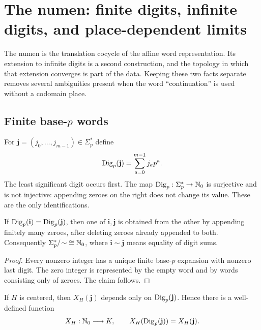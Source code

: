 \section{The numen: finite digits, infinite digits, and place-dependent limits}
\label{sec:numen}

The numen is the translation cocycle of the affine word representation.  Its
extension to infinite digits is a second construction, and the topology in
which that extension converges is part of the data.  Keeping these two facts
separate removes several ambiguities present when the word ``continuation''
is used without a codomain place.

\subsection{Finite base-\texorpdfstring{$p$}{p} words}

For $\mathbf j=(j_0,\ldots,j_{m-1})\in\Sigma_p^*$ define
\begin{equation}
\label{eq:digsum}
 \operatorname{Dig}_p(\mathbf j)=\sum_{a=0}^{m-1}j_ap^a.
\end{equation}
The least significant digit occurs first.  The map $\operatorname{Dig}_p:\Sigma_p^*\to
\mathbb N_0$ is surjective and is not injective: appending zeroes on the right does
not change its value.  These are the only identifications.

\begin{lemma}
\label{lem:word-quotient}
If $\operatorname{Dig}_p(\mathbf i)=\operatorname{Dig}_p(\mathbf j)$, then one of $\mathbf i,\mathbf j$ is
obtained from the other by appending finitely many zeroes, after deleting
zeroes already appended to both.  Consequently
$\Sigma_p^*/\!\sim\;\cong\mathbb N_0$, where
$\mathbf i\sim\mathbf j$ means equality of digit sums.
\end{lemma}

\begin{proof}
Every nonzero integer has a unique finite base-$p$ expansion with nonzero
last digit.  The zero integer is represented by the empty word and by words
consisting only of zeroes.  The claim follows.
\end{proof}

\begin{proposition}
\label{prop:numen-descent}
If $H$ is centered, then $X_H(\mathbf j)$ depends only on
$\operatorname{Dig}_p(\mathbf j)$.  Hence there is a well-defined function
\[
 X_H:\mathbb N_0\longrightarrow K,
 \qquad X_H(\operatorname{Dig}_p(\mathbf j))=X_H(\mathbf j).
\]
\end{proposition}

